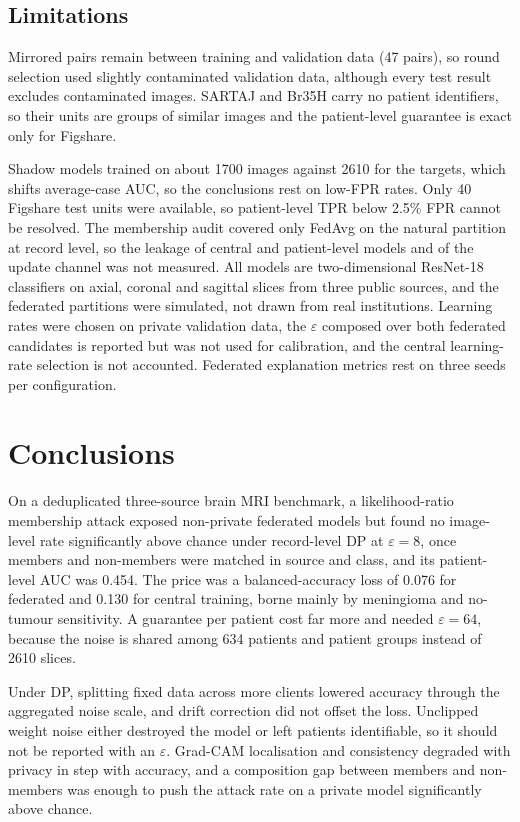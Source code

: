 \documentclass[preprint,12pt]{elsarticle}
\begin{document}
\subsection{Limitations}
Mirrored pairs remain between training and validation data (47 pairs), so round selection used slightly contaminated
validation data, although every test result excludes contaminated images. SARTAJ and Br35H carry no patient
identifiers, so their units are groups of similar images and the patient-level guarantee is exact only for Figshare.

Shadow models trained on about 1700 images against 2610 for the targets, which shifts average-case AUC, so the
conclusions rest on low-FPR rates. Only 40 Figshare test units were available, so patient-level TPR below 2.5\% FPR
cannot be resolved. The membership audit covered only FedAvg on the natural partition at record level, so the leakage
of central and patient-level models and of the update channel was not measured. All models are two-dimensional
ResNet-18 classifiers on axial, coronal and sagittal slices from three public sources, and the federated partitions
were simulated, not drawn from real institutions. Learning rates were chosen on private validation data, the
$\varepsilon$ composed over both federated candidates is reported but was not used for calibration, and the central
learning-rate selection is not accounted. Federated explanation metrics rest on three seeds per configuration.

\section{Conclusions}\label{sec:conclusions}
On a deduplicated three-source brain MRI benchmark, a likelihood-ratio membership attack exposed non-private
federated models but found no image-level rate significantly above chance under record-level DP at $\varepsilon=8$,
once members and non-members were matched in source and class, and its patient-level AUC was 0.454. The price was a
balanced-accuracy loss of 0.076 for federated and 0.130 for central training, borne mainly by meningioma and no-tumour
sensitivity. A guarantee per patient cost far
more and needed $\varepsilon=64$, because the noise is shared among 634 patients and patient groups instead of 2610
slices.

Under DP, splitting fixed data across more clients lowered accuracy through the aggregated noise scale, and drift
correction did not offset the loss. Unclipped weight noise either destroyed the model or left patients identifiable, so
it should not be reported with an $\varepsilon$. Grad-CAM localisation and consistency degraded with privacy in step
with accuracy, and a composition gap between members and non-members was enough to push the attack rate on a
private model significantly above chance.
\end{document}
